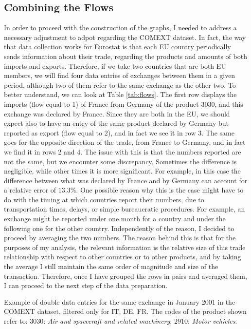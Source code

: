 \subsection{Combining the Flows}
In order to proceed with the construction of the graphs, I needed to address a necessary adjustment to adpot regarding the COMEXT dataset. In fact, the way that data collection works for Eurostat is that each EU country periodically sends information about their trade, regarding the products and amounts of both imports and exports. Therefore, if we take two countries that are both EU members, we will find four data entries of exchanges between them in a given period, although two of them refer to the same exchange as the other two. To better understand, we can look at Table \ref{tab:flows}. The first row displays the imports (flow equal to 1) of France from Germany of the product 3030, and this exchange was declared by France. Since they are both in the EU, we should expect also to have an entry of the same product declared by Germany but reported as export (flow equal to 2), and in fact we see it in row 3. The same goes for the opposite direction of the trade, from France to Germany, and in fact we find it in rows 2 and 4. The issue with this is that the numbers reported are not the same, but we encounter some discrepancy. Sometimes the difference is negligible, while other times it is more significant. For example, in this case the difference between what was declared by France and by Germany can account for a relative error of $13.3\%$. One possible reason why this is the case might have to do with the timing at which countries report their numbers, due to transportation times, delays, or simple bureaucratic procedures. For example, an exchange might be reported under one month for a country and under the following one for the other country.
Independently of the reason, I decided to proceed by averaging the two numbers. The reason behind this is that for the purposes of my analysis, the relevant information is the relative size of this trade relationship with respect to other countries or to other products, and by taking the average I still maintain the same order of magnitude and size of the transaction.
Therefore, once I have grouped the rows in pairs and averaged them, I can proceed to the next step of the data preparation.

\begin{table}
    \centering
    
    \caption[Example of double data entries for the same exchange in January 2001 in the COMEXT dataset, filtered only for IT, DE, FR.]{Example of double data entries for the same exchange in January 2001 in the COMEXT dataset, filtered only for IT, DE, FR. The codes of the product shown refer to: 3030: \textit{Air and spacecraft and related machinery}; 2910: \textit{Motor vehicles}.}
    \label{tab:flows}
\end{table}

